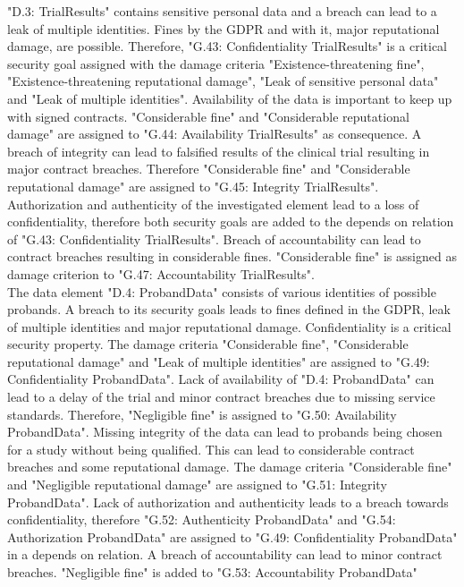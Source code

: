 \newline
"D.3: TrialResults" contains sensitive personal data and a breach can lead to a leak of multiple identities. Fines by the GDPR and with it, major reputational damage, are possible. Therefore, "G.43: Confidentiality TrialResults" is a critical security goal assigned with the damage criteria "Existence-threatening fine", "Existence-threatening reputational damage", "Leak of sensitive personal data" and "Leak of multiple identities". Availability of the data is important to keep up with signed contracts. "Considerable fine" and "Considerable reputational damage" are assigned to "G.44: Availability TrialResults" as consequence. A breach of integrity can lead to falsified results of the clinical trial resulting in major contract breaches. Therefore "Considerable fine" and "Considerable reputational damage" are assigned to "G.45: Integrity TrialResults". Authorization and authenticity of the investigated element lead to a loss of confidentiality, therefore both security goals are added to the depends on relation of "G.43: Confidentiality TrialResults". Breach of accountability can lead to contract breaches resulting in considerable fines. "Considerable fine" is assigned as damage criterion to "G.47: Accountability TrialResults".\\
\newline
The data element "D.4: ProbandData" consists of various identities of possible \\probands. A breach to its security goals leads to fines defined in the GDPR, leak of multiple identities and major reputational damage. Confidentiality is a critical security property. The damage criteria "Considerable fine", "Considerable reputational damage" and "Leak of multiple identities" are assigned to "G.49: Confidentiality ProbandData". Lack of availability of "D.4: ProbandData" can lead to a delay of the trial and minor contract breaches due to missing service standards. Therefore, "Negligible fine" is assigned to "G.50: Availability ProbandData". Missing integrity of the data can lead to probands being chosen for a study without being qualified. This can lead to considerable contract breaches and some reputational damage. The damage criteria "Considerable fine" and "Negligible reputational damage" are assigned to "G.51: Integrity ProbandData". Lack of authorization and authenticity leads to a breach towards confidentiality, therefore "G.52: Authenticity ProbandData" and "G.54: Authorization ProbandData" are assigned to "G.49: Confidentiality ProbandData" in a depends on relation. A breach of accountability can lead to minor contract breaches. "Negligible fine" is added to "G.53: Accountability ProbandData"\\
